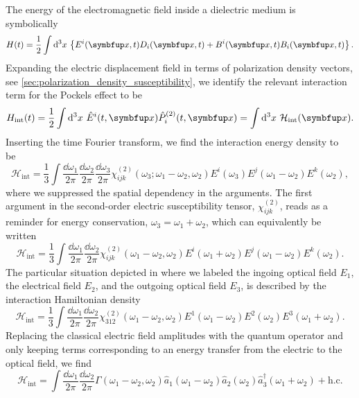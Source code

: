 The energy of the electromagnetic field inside a dielectric medium is symbolically~\cite[p.~124]{Jackson2007}
\begin{equation}
	H(t)
	=
	\frac{1}{2}
	\int\dd[3]{x}
	\left\{
		E^i(\vb{x},t)
		D_i(\vb{x},t)
		+
		B^i(\vb{x},t)
		B_i(\vb{x},t)
	\right\}
	.
\end{equation}
Expanding the electric displacement field in terms of polarization density vectors, see \cref{sec:polarization_density_susceptibility}, we identify the relevant interaction term for the Pockels effect to be
\begin{equation}
	H_\text{int}(t)
	=
	\frac{1}{2}
	\int\dd[3]{x}
	\hat{E}^i(t,\vb{x})
	\hat{P}_i^{(2)}(t,\vb{x})
	=
	\int\dd[3]{x}
	\mathcal{H}_\text{int}(\vb{x})
	.
\end{equation}
Inserting the time Fourier transform, we find the interaction energy density to be~\cite[p.~1070]{Mandel1995}
\begin{equation}
	\mathcal{H}_\text{int}
	=
	\frac{1}{3}
	\int\frac{\dd{\omega_1}}{2\pi}\frac{\dd{\omega_2}}{2\pi}\frac{\dd{\omega_3}}{2\pi}
	\chi_{ijk}^{(2)}\left(\omega_3;\omega_1-\omega_2,\omega_2\right)
	E^i(\omega_3)
	E^j(\omega_1-\omega_2)
	E^k(\omega_2)
	,
\end{equation}
where we suppressed the spatial dependency in the arguments.
The first argument in the second-order electric susceptibility tensor, $\chi_{ijk}^{(2)}$, reads as a reminder for energy conservation, $\omega_3=\omega_1+\omega_2$, which can equivalently be written
\begin{equation}
	\mathcal{H}_\text{int}
	=
	\frac{1}{3}
	\int\frac{\dd{\omega_1}}{2\pi}\frac{\dd{\omega_2}}{2\pi}
	\chi_{ijk}^{(2)}\left(\omega_1-\omega_2,\omega_2\right)
	E^i(\omega_1+\omega_2)
	E^j(\omega_1-\omega_2)
	E^k(\omega_2)
	.
\end{equation}
The particular situation depicted in  where we labeled the ingoing optical field $E_1$, the electrical field $E_2$, and the outgoing optical field $E_3$, is described by the interaction Hamiltonian density
\begin{equation}
	\mathcal{H}_\text{int}
	=
	\frac{1}{3}
	\int\frac{\dd{\omega_1}}{2\pi}\frac{\dd{\omega_2}}{2\pi}
	\chi_{312}^{(2)}\left(\omega_1-\omega_2,\omega_2\right)
	E^1(\omega_1-\omega_2)
	E^2(\omega_2)
	E^3(\omega_1+\omega_2)
	.
\end{equation}
Replacing the classical electric field amplitudes with the quantum operator and only keeping terms corresponding to an energy transfer from the electric to the optical field, we find
\begin{equation}
	\mathcal{H}_\text{int}
	=
	\int\frac{\dd{\omega_1}}{2\pi}\frac{\dd{\omega_2}}{2\pi}
	\Gamma(\omega_1-\omega_2,\omega_2)
	\hat{a}_1(\omega_1-\omega_2)
	\hat{a}_2(\omega_2)
	\hat{a}_3^\dagger(\omega_1+\omega_2)
	+
	\text{h.c.}
\end{equation}



